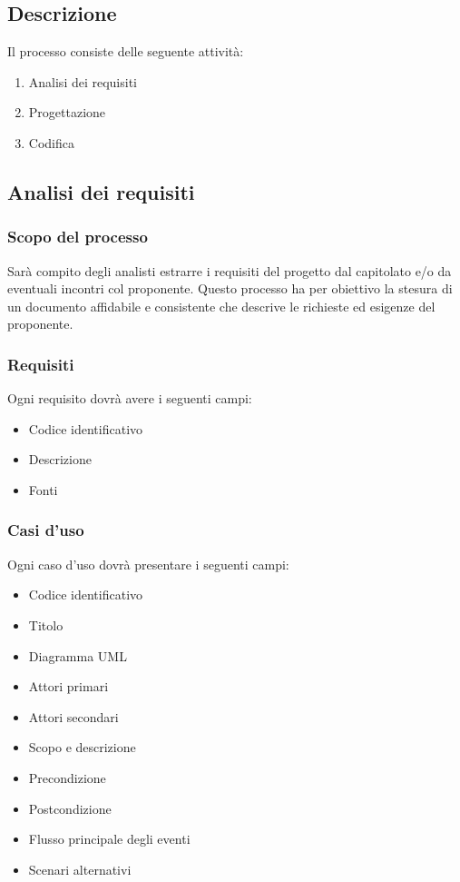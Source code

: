 \documentclass[a4paper,11pt]{article}
\begin{document}
		\subsection{Descrizione}
		Il processo consiste delle seguente attività:
			\begin{enumerate}
				\item Analisi dei requisiti
				\item Progettazione
				\item Codifica
			\end{enumerate}
		\subsection{Analisi dei requisiti}
		
			\subsubsection{Scopo del processo}
			Sarà compito degli analisti estrarre i requisiti del progetto dal capitolato e/o da eventuali incontri col proponente. 
			Questo processo ha per obiettivo la stesura di un documento affidabile e consistente che descrive le richieste ed esigenze del proponente.
				
			\subsubsection{Requisiti}
			Ogni requisito dovrà avere i seguenti campi:
			\begin{itemize}
			\item Codice identificativo
			\item Descrizione
			\item Fonti
			\end{itemize}
			\subsubsection{Casi d'uso}
			Ogni caso d'uso dovrà presentare i seguenti campi:
			\begin{itemize}
			\item Codice identificativo
			\item Titolo
			\item Diagramma UML\addglos
			\item Attori primari
			\item Attori secondari
			\item Scopo e descrizione
			\item Precondizione
			\item Postcondizione
			\item Flusso principale degli eventi
			\item Scenari alternativi
			\end{itemize}
	
\end{document}
